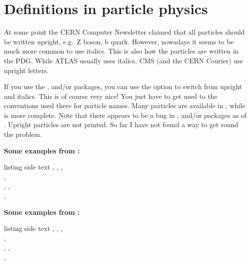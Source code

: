 \section{Definitions in particle physics}%
\label{sec:tips:hepparticles}

At some point the CERN Computer Newsletter claimed that all particles should be written
upright, e.g.\ \(\text{Z}\) boson, \(\text{b}\) quark.
However, nowadays it seems to be much more common to use italics.
This is also how the particles are written in the PDG\@.
While ATLAS usually uses italics, CMS (and the CERN Courier) use upright letters.

If you use the ,  and/or  packages,
you can use the option  to switch from upright and italics.
This is of course very nice!
You just have to get used to the conventions used there for particle names.
Many particles are available in ,
while  is more complete.
Note that there appears to be a bug in
,  and/or  packages
as of .
Upright particles are not printed.
So far I have not found a way to get round the problem.

\noindent\textbf{Some examples from :}\\
\begin{tcblisting}{listing side text}
\Pe, \Pl, \Pqt, \Paqt\\
\PZ, \PWpm\\
\PBz, \PBpm, \PacB\\
\PBz{}\PBz, \PBz\PBz
\end{tcblisting}

\noindent\textbf{Some examples from :}\\
\begin{tcblisting}{listing side text}
\APelectron, \Plepton, \Ptop, \APtop\\
\PZ, \PWpm\\
\PBzero, \PBpm, \APBc\\
\PBzero{}\PBzero, \PBzero\PBzero
\end{tcblisting}

